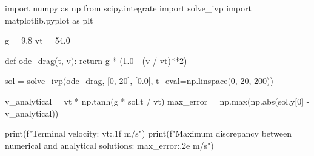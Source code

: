 \begin{pythonbox}
import numpy as np
from scipy.integrate import solve_ivp
import matplotlib.pyplot as plt

g = 9.8
vt = 54.0

def ode_drag(t, v):
    return g * (1.0 - (v / vt)**2)

sol = solve_ivp(ode_drag, [0, 20], [0.0], t_eval=np.linspace(0, 20, 200))

v_analytical = vt * np.tanh(g * sol.t / vt)
max_error = np.max(np.abs(sol.y[0] - v_analytical))

print(f"Terminal velocity: {vt:.1f} m/s")
print(f"Maximum discrepancy between numerical and analytical solutions: {max_error:.2e} m/s")
\end{pythonbox}

